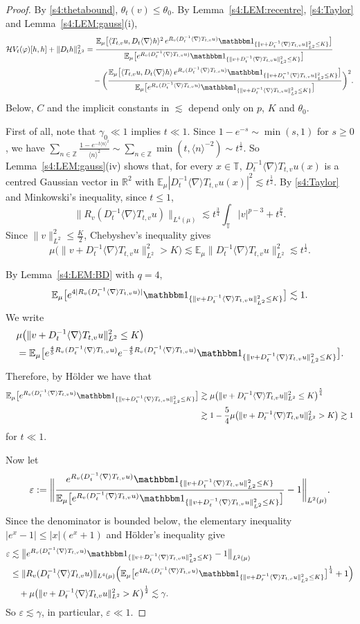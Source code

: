 \documentclass[letterpaper, 11pt,  reqno]{amsart}
\theoremstyle{definition}
\newcommand{\1}{\mathbbm 1}
\newcommand{\noi}{\noindent}
\newcommand{\Z}{\mathbb{Z}}
\newcommand{\R}{\mathbb{R}}
\newcommand{\T}{\mathbb{T}}
\renewcommand{\H}{\mathcal H}
\newcommand{\0}{\mathbf 0}
\newcommand{\E}{\mathbb{E}}
\newcommand{\nb}{\nabla}
\newcommand{\ep}{\varepsilon}
\newcommand{\g}{\gamma}
\newcommand{\les}{\lesssim}
\newcommand{\jb}[1]
{\langle #1 \rangle}
\newcommand{\ind}{\mathbbm 1}
\newcommand{\ph}{\varphi}
\renewcommand{\H}{\mathcal{H}}
\newcommand{\eps}{\ep}
\numberwithin{equation}{section}
\numberwithin{theorem}{section}
\newcommand{\RT}{R_v(D_t^{-1}\jb\nb T_{t,v}u)}
\newcommand{\IT}{\ind_{\{\|v+D_t^{-1}\jb\nb T_{t,v}u\|_{L^2}^2\le K\}}}
\begin{document}
\begin{proof}
By \eqref{s4:thetabound}, $\theta_t(v)\le\theta_0$. By Lemma~\ref{s4:LEM:recentre}, \eqref{s4:Taylor} and
Lemma~\ref{s4:LEM:gauss}(i),
\begin{equation}\label{s4:Hessratio}
\begin{aligned}
\H V_t(\ph)[h,h]+\|D_th\|_{L^2}^2
&=\frac{\E_\mu\big[\jb{T_{t,v}u,D_t\jb\nb h}^2\,e^{\RT}\IT\big]}{\E_\mu\big[e^{\RT}\IT\big]}\\
&\quad-\bigg(\frac{\E_\mu\big[\jb{T_{t,v}u,D_t\jb\nb h}\,e^{\RT}\IT\big]}{\E_\mu\big[e^{\RT}\IT\big]}\bigg)^2 .
\end{aligned}
\end{equation}
Below, $C$ and the implicit constants in $\les$ depend only on $p$, $K$ and $\theta_0$.

First of all, note that $\g_0 \ll 1$ implies $t \ll 1$.
Since $1-e^{-s}\sim\min(s,1)$ for $s\ge0$, we have
$\sum_{n\in\Z}\frac{1-e^{-t\jb n^2}}{\jb n^2}\sim\sum_{n\in\Z}\min(t,\jb n^{-2})\sim t^{\frac12}$.
So Lemma~\ref{s4:LEM:gauss}(iv) shows that, for every $x\in\T$, $D_t^{-1}\jb\nb T_{t,v}u(x)$ is a centred Gaussian
vector in $\R^2$ with $\E_\mu|D_t^{-1}\jb\nb T_{t,v}u(x)|^2\les t^\frac12$. By \eqref{s4:Taylor} and Minkowski's
inequality, since $t\le1$,
\[
\|\RT\|_{L^4(\mu)}\les t^{\frac34}\int_\T|v|^{p-3}+t^{\frac p4}.
\]
Since $\|v\|_{L^2}^2\le\frac K2$, Chebyshev's inequality gives
\[
\mu\big(\|v+D_t^{-1}\jb\nb T_{t,v}u\|_{L^2}^2>K\big)\les\E_\mu\|D_t^{-1}\jb\nb T_{t,v}u\|_{L^2}^2\les t^\frac12 .
\]

\noi
 By Lemma~\ref{s4:LEM:BD} with $q=4$,
\[
\E_\mu\big[e^{4|\RT|}\IT\big]\les1 .
\]
We write
\begin{align*}
&\mu\big(\|v+D_t^{-1}\jb\nb T_{t,v}u\|_{L^2}^2\le K\big) \\
&= \E_\mu\big[e^{\frac45\RT} e^{-\frac45\RT}\IT\big].
\end{align*}
Therefore, by H\"older we have that
\begin{align*}
\E_\mu\big[e^{\RT}\IT\big]& \gtrsim \mu\big(\|v+D_t^{-1}\jb\nb T_{t,v}u\|_{L^2}^2\le K\big)^\frac54\\
&\gtrsim 1 - \frac 54 \mu\big(\|v+D_t^{-1}\jb\nb T_{t,v}u\|_{L^2}^2>K\big) \gtrsim 1
\end{align*}
for $t \ll 1$.

Now let
\[
\eps:=\bigg\|\frac{e^{\RT}\IT}{\E_\mu\big[e^{\RT}\IT\big]}-1\bigg\|_{L^2(\mu)} .
\]
Since the denominator is bounded below,  the elementary inequality $|e^x-1|\le|x|(e^x+1)$ and H\"older's inequality give
\[
\begin{aligned}
\eps&\les\big\|e^{\RT}\IT-1\big\|_{L^2(\mu)}\\
&\le\|\RT\|_{L^4(\mu)}\Big(\E_\mu\big[e^{4\RT}\IT\big]^{\frac14}+1\Big)\\
&\quad+\mu\big(\|v+D_t^{-1}\jb\nb T_{t,v}u\|_{L^2}^2>K\big)^{\frac12}\les\gamma .
\end{aligned}
\]
So $\eps\les\gamma$, in particular, $\eps\ll 1$.


\end{proof}
\end{document}
